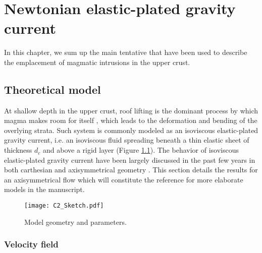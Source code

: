 \chapter{Newtonian elastic-plated gravity current} 
\label{chap2} 
\minitoc

In this chapter, we  sum up the main tentative that  have been used to
describe the emplacement of magmatic intrusions in the upper crust.

\section{Theoretical model}
\label{sec:model-1}

At shallow  depth in  the upper  crust, roof  lifting is  the dominant
process     by    which     magma     makes     room    for     itself
\citep{Johnson:1973ho,Pollard:1973ho}, which leads  to the deformation
and bending of the overlying  strata.  Such system is commonly modeled
as an  isoviscous elastic-plated gravity current,  i.e.  an isoviscous
fluid spreading  beneath a thin  elastic sheet of thickness  $d_c$ and
above  a  rigid   layer  \citep{Michaut:2011kg,Bunger:2011cb}  (Figure
\ref{C2-Sketch}).  The  behavior of isoviscous  elastic-plated gravity
current have  been largely  discussed in  the past  few years  in both
carthesian \citep{Michaut:2011kg,Bunger:2011cb,Anonymous:QWXp_4JV} and
axisymmetrical  geometry  \citep{Michaut:2013dr,Lister:2013ia}.   This
section  details the  results for  an axisymmetrical  flow which  will
constitute the reference for more elaborate models in the manuscript.

\begin{figure}[htbp]
  \begin{center}
    \graphicspath{ {/Users/thorey/Documents/These/Manuscript/Figure/Chapter2/} }
    \texttt{[image: C2\_Sketch.pdf]}
    \caption{Model geometry and parameters.}
    \label{C2-Sketch}
  \end{center}
\end{figure}

\subsection{Velocity field}
\label{sec:Velocity field}

